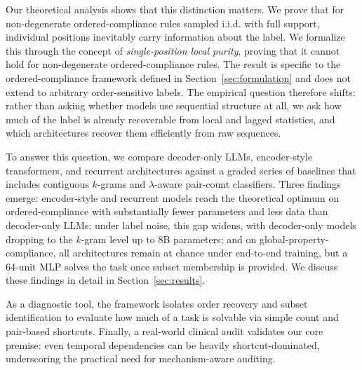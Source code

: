 \documentclass{article}
\theoremstyle{plain}
\theoremstyle{definition}
\theoremstyle{remark}
\begin{document}
Our theoretical analysis shows that this distinction matters. We prove that for non-degenerate ordered-compliance rules sampled i.i.d. with full support, individual positions inevitably carry information about the label. We formalize this through the concept of \emph{single-position local purity}, proving that it cannot hold for non-degenerate ordered-compliance rules. The result is specific to the ordered-compliance framework defined in Section~\ref{sec:formulation} and does not extend to arbitrary order-sensitive labels. The empirical question therefore shifts: rather than asking whether models use sequential structure at all, we ask how much of the label is already recoverable from local and lagged statistics, and which architectures recover them efficiently from raw sequences.

To answer this question, we compare decoder-only LLMs, encoder-style transformers, and recurrent architectures against a graded series of baselines that includes contiguous $k$-grams and $\lambda$-aware pair-count classifiers. Three findings emerge: encoder-style and recurrent models reach the theoretical optimum on ordered-compliance with substantially fewer parameters and less data than decoder-only LLMs; under label noise, this gap widens, with decoder-only models dropping to the $k$-gram level up to 8B parameters; and on global-property-compliance, all architectures remain at chance under end-to-end training, but a 64-unit MLP solves the task once subset membership is provided. We discuss these findings in detail in Section~\ref{sec:results}.

As a diagnostic tool, the framework isolates order recovery and subset identification to evaluate how much of a task is solvable via simple count and pair-based shortcuts. Finally, a real-world clinical audit validates our core premise: even temporal dependencies can be heavily shortcut-dominated, underscoring the practical need for mechanism-aware auditing.
\end{document}
